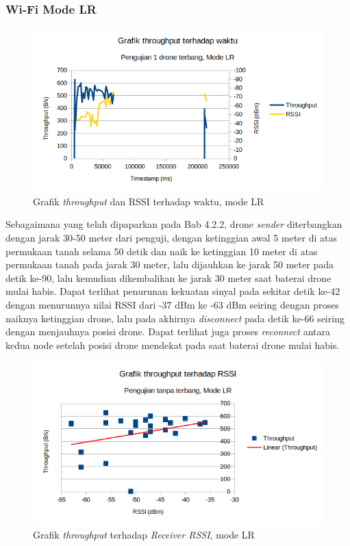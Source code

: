 \subsubsection{Wi-Fi Mode LR}
\begin{figure}[H]
	\centering
	\includegraphics[scale=0.7]{./assets/Graphs/1Fly_LR/Throughput-Time}
	\caption{Grafik \textit{throughput} dan RSSI terhadap waktu, mode LR}
\end{figure}
Sebagaimana yang telah dipaparkan pada Bab 4.2.2, drone \textit{sender} diterbangkan dengan jarak 30-50 meter dari penguji, dengan ketinggian awal 5 meter di atas permukaan tanah selama 50 detik dan naik ke ketinggian 10 meter di atas permukaan tanah pada jarak 30 meter, lalu dijauhkan ke jarak 50 meter pada detik ke-90, lalu kemudian dikembalikan ke jarak 30 meter saat baterai drone mulai habis. Dapat terlihat penurunan kekuatan sinyal pada sekitar detik ke-42 dengan menurunnya nilai RSSI dari -37 dBm ke -63 dBm seiring dengan proses naiknya ketinggian drone, lalu pada akhirnya \textit{disconnect} pada detik ke-66 seiring dengan menjauhnya posisi drone. Dapat terlihat juga proses \textit{reconnect} antara kedua node setelah posisi drone mendekat pada saat baterai drone mulai habis.
\begin{figure}[H]
	\centering
	\includegraphics[scale=0.7]{./assets/Graphs/1Fly_LR/Throughput-RSSI}
	\caption{Grafik \textit{throughput} terhadap \textit{Receiver RSSI}, mode LR}
\end{figure}
